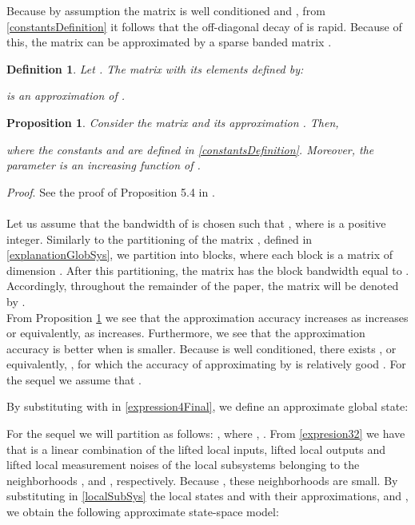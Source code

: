 \documentclass[journal,10pt]{IEEEtran}
\newtheorem{definition}[thm]{Definition}
\newtheorem{proposition}[thm]{Proposition}
\begin{document}
Because by assumption the matrix  is well conditioned and , from \eqref{constantsDefinition} it follows that the off-diagonal decay of  is rapid. Because of this, the matrix  can be approximated by a sparse banded matrix \cite{benzi2007}. \\
\begin{definition} \cite{benzi2007} Let . The matrix  with its elements defined by:
\begin{small}

\end{small}
is an approximation of .
\label{blockBandedDefinition} \\
\end{definition}
\begin{proposition}
Consider the matrix  and its approximation . Then,
\begin{small}

\end{small}
where the constants  and  are defined in \eqref{constantsDefinition}. Moreover, the parameter  is an increasing function of .
\label{blockBandedApprox}
\end{proposition} 
\textit{Proof}. See the proof of Proposition 5.4 in \cite{haberThesis}.
 \\ \\
 Let us assume that the bandwidth of   is chosen such that , where  is a positive integer. Similarly to the partitioning of the matrix , defined in \eqref{explanationGlobSys}, we partition  into  blocks, where each block is a matrix of dimension . After this partitioning, the matrix  has the block bandwidth equal to . Accordingly, throughout the remainder of the paper, the matrix  will be denoted by .
\\
From Proposition \ref{blockBandedApprox} we see that the approximation accuracy increases as  increases or equivalently, as   increases. Furthermore, we see that the approximation accuracy is better when  is smaller. Because  is well conditioned, there exists , or equivalently, , for which the accuracy of approximating  by  is relatively good \cite{benzi2007}. For the sequel we assume that .
\par
By substituting  with  in \eqref{expression4Final}, we define an approximate global state:
\begin{small} 

\end{small}
 For the sequel we will partition  as follows: , where ,  . From \eqref{expresion32} we have that  is a linear combination of the lifted local inputs, lifted local outputs and lifted local measurement noises of the local subsystems belonging to the neighborhoods ,  and , respectively. 
Because , these neighborhoods are small. By substituting in \eqref{localSubSys} the local states  and  with their approximations,  and , we obtain the following approximate state-space model:
\begin{small}

\end{small}
\end{document}
